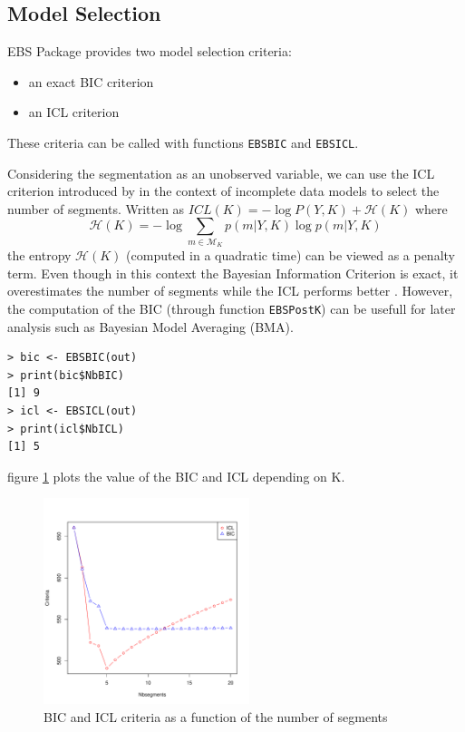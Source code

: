 \documentclass{bioinfo}
\begin{document}
\begin{methods}
\subsection{Model Selection}

EBS Package provides two model selection criteria:
\begin{itemize}
\item an exact BIC criterion
\item an ICL criterion
\end{itemize}


These criteria can be called with functions \texttt{EBSBIC} and \texttt{EBSICL}. 

Considering the segmentation as an unobserved variable, we can use the ICL criterion introduced by \cite{biernacki_assessingmixture_2000} in the context of incomplete data models to select the number of segments. Written as $ICL(K) = -\log P(Y,K) + \mathcal{H}(K) \label{ICL}$ where 
\begin{equation}
  \mathcal{H}(K)=-\log \sum_{m\in \mathcal{M}_K} p(m|Y,K) \log p(m|Y,K)
\end{equation}
the entropy $\mathcal{H}(K)$ (computed in a quadratic time) can be viewed as a penalty term. 
 Even though in this context the Bayesian Information Criterion is exact, it overestimates the number of segments while the ICL performs better \citep{rigaill_exact_2011}. However, the computation of the BIC (through function \texttt{EBSPostK}) can be usefull for later analysis such as Bayesian Model Averaging (BMA).
\begin{verbatim}
> bic <- EBSBIC(out)
> print(bic$NbBIC)
[1] 9
> icl <- EBSICL(out)
> print(icl$NbICL)
[1] 5

\end{verbatim}

figure \ref{fig:01} plots the value of the BIC and ICL depending on K. 

\begin{figure}[!h]%
\centerline{\includegraphics[width=6cm]{icl-bic.pdf}}
\caption{BIC and ICL criteria as a function of the number of segments} \label{fig:01}
\end{figure}







\end{methods}
\end{document}
